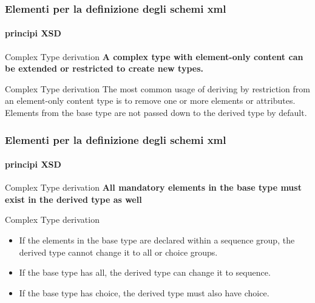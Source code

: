 

\begin{frame}
	\frametitle{Elementi per la definizione degli schemi xml}
	\framesubtitle{principi XSD}
	\addtocounter{nframe}{1}

	\begin{block}{Complex Type derivation}
		\textbf{A complex type with element-only content can be extended or restricted to create new types.}
	\end{block}

	\begin{block}{Complex Type derivation}
		The most common usage of deriving by restriction from an element-only content type is to remove one or more elements or attributes. Elements from the base type are not passed down to the derived type by default.
	\end{block}
\end{frame}


\begin{frame}
	\frametitle{Elementi per la definizione degli schemi xml}
	\framesubtitle{principi XSD}
	\addtocounter{nframe}{1}

	\begin{block}{Complex Type derivation}
		\textbf{All mandatory elements in the base type must exist in the derived type as well}
	\end{block}

	\begin{block}{Complex Type derivation}
		\begin{itemize}
			\item If the elements in the base type are declared within a sequence group, the derived type cannot change it to all or choice groups.
			\item If the base type has all, the derived type can change it to sequence.
			\item If the base type has choice, the derived type must also have choice.
		\end{itemize}
	\end{block}
\end{frame}

